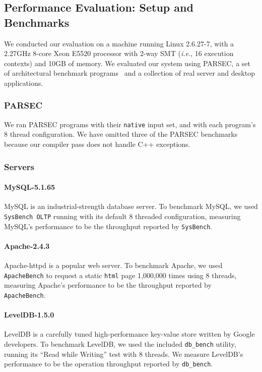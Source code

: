 \documentclass[preprint,10pt]{sigplanconf}
\begin{document}
\subsection{Performance Evaluation: Setup and Benchmarks}

We conducted our evaluation on a machine running Linux 2.6.27-7, with a 2.27GHz
8-core Xeon E5520 processor with 2-way SMT ({\em i.e.}, 16 execution contexts)
and 10GB of memory.  We evaluated our system using PARSEC, a set of
architectural benchmark programs~\cite{parsec} and a collection of real server
and desktop applications.    

\subsubsection{PARSEC}

We ran PARSEC programs with their {\tt native} input set, and with each
program's 8 thread configuration. We have omitted three of the PARSEC
benchmarks because our compiler pass does not handle C++ exceptions.    

\subsubsection{Servers}


\paragraph{MySQL-5.1.65} MySQL is an industrial-strength database
server. To benchmark MySQL, we used {\tt SysBench OLTP} running with its
default 8 threaded configuration, measuring MySQL's performance to be the
throughput reported by {\tt SysBench}.  

\paragraph{Apache-2.4.3} 
Apache-httpd is a popular web server.  To benchmark Apache, we used {\tt
ApacheBench} to request a static {\tt html} page 1,000,000 times using 8
threads, measuring Apache's performance to be the throughput reported by {\tt
ApacheBench}.  

\paragraph{LevelDB-1.5.0}
LevelDB is a carefully tuned high-performance key-value store written by Google
developers. To benchmark LevelDB, we used the included {\tt db\_bench} utility,
running its ``Read while Writing'' test with 8 threads.  We measure LevelDB's
performance to be the operation throughput reported by {\tt db\_bench}.
\end{document}
